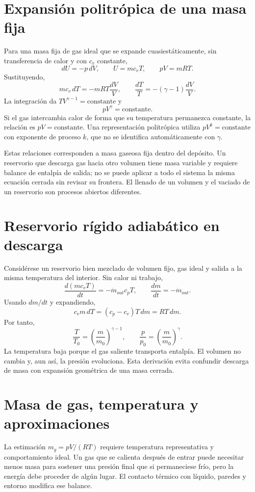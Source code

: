 \section{Expansión politrópica de una masa fija}
Para una masa fija de gas ideal que se expande cuasiestáticamente, sin transferencia de calor y con $c_v$ constante,
\[
 dU=-p\,dV,\qquad U=mc_vT,\qquad pV=mRT.
\]
Sustituyendo,
\[
 mc_v\,dT=-mRT\frac{dV}{V},
 \qquad \frac{dT}{T}=-(\gamma-1)\frac{dV}{V}.
\]
La integración da $TV^{\gamma-1}=\text{constante}$ y
\begin{equation}\label{eq:blowdown}
 pV^\gamma=\text{constante}.
\end{equation}
Si el gas intercambia calor de forma que su temperatura permanezca constante, la relación es $pV=\text{constante}$. Una representación politrópica utiliza $pV^k=\text{constante}$ con exponente de proceso $k$, que no se identifica automáticamente con $\gamma$.

Estas relaciones corresponden a masa gaseosa fija dentro del depósito. Un reservorio que descarga gas hacia otro volumen tiene masa variable y requiere balance de entalpía de salida; no se puede aplicar a todo el sistema la misma ecuación cerrada sin revisar su frontera. El llenado de un volumen y el vaciado de un reservorio son procesos abiertos diferentes.
\section{Reservorio rígido adiabático en descarga}
Considérese un reservorio bien mezclado de volumen fijo, gas ideal y salida a la misma temperatura del interior. Sin calor ni trabajo,
\[
 \frac{d(mc_vT)}{dt}=-\dot m_{out}c_pT,
 \qquad \frac{dm}{dt}=-\dot m_{out}.
\]
Usando $dm/dt$ y expandiendo,
\[
 c_vm\,dT=(c_p-c_v)T\,dm=RT\,dm.
\]
Por tanto,
\[
 \frac{T}{T_0}=\left(\frac{m}{m_0}\right)^{\gamma-1},\qquad
 \frac{p}{p_0}=\left(\frac{m}{m_0}\right)^\gamma.
\]
La temperatura baja porque el gas saliente transporta entalpía. El volumen no cambia y, aun así, la presión evoluciona. Esta derivación evita confundir descarga de masa con expansión geométrica de una masa cerrada.
\section{Masa de gas, temperatura y aproximaciones}
La estimación $m_g=pV/(RT)$ requiere temperatura representativa y comportamiento ideal. Un gas que se calienta después de entrar puede necesitar menos masa para sostener una presión final que si permaneciese frío, pero la energía debe proceder de algún lugar. El contacto térmico con líquido, paredes y entorno modifica ese balance.

